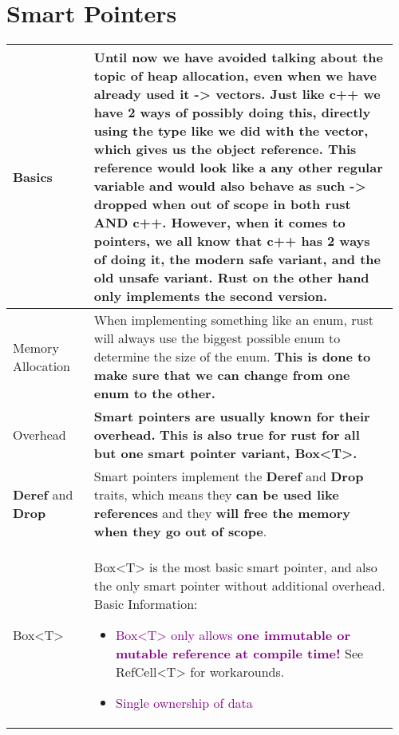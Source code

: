 \documentclass[main.tex,fontsize=8pt,paper=a4,paper=portrait,DIV=calc,]{scrartcl}
\begin{document}
\pagebreak
\begin{table}[ht!]
\section{Smart Pointers}
\begin{tabular}{|m{0.2\linewidth}|m{0.755\linewidth}|}
\hline
Basics & 
Until now we have avoided talking about the topic of heap allocation, even when we have already used it -> vectors. \newline
Just like c++ we have 2 ways of possibly doing this, directly using the type like we did with the vector, which gives us the object reference.\newline
This reference would look like a any other regular variable and would also behave as such -> dropped when out of scope in both rust AND c++. \newline
However, when it comes to pointers, we all know that c++ has 2 ways of doing it, the modern safe variant, and the old unsafe variant. \newline
Rust on the other hand only implements the second version.\\
\hline
Memory Allocation & 
When implementing something like an enum, rust will always use the biggest possible enum to determine the size of the enum.\newline
\textbf{This is done to make sure that we can change from one enum to the other.}\\
\hline
Overhead & 
\textbf{Smart pointers are usually known for their overhead.}\newline
\textbf{This is also true for rust for all but one smart pointer variant, Box<T>.}\\
\hline
\textbf{Deref} and \textbf{Drop} & 
Smart pointers implement the \textbf{Deref} and \textbf{Drop} traits, which means they \textbf{can be used like references} and they \textbf{will free the memory when they go out of scope}.\\
\hline
Box<T> & 
Box<T> is the most basic smart pointer, and also the only smart pointer without additional overhead.\newline
Basic Information:\newline
\begin{itemize}
\item \textcolor{purple}{Box<T> only allows \textbf{one immutable or mutable reference at compile time!}}\newline
  See RefCell<T> for workarounds.
\item \textcolor{purple}{Single ownership of data}

\end{itemize}
\end{tabular}
\end{table}
\end{document}
